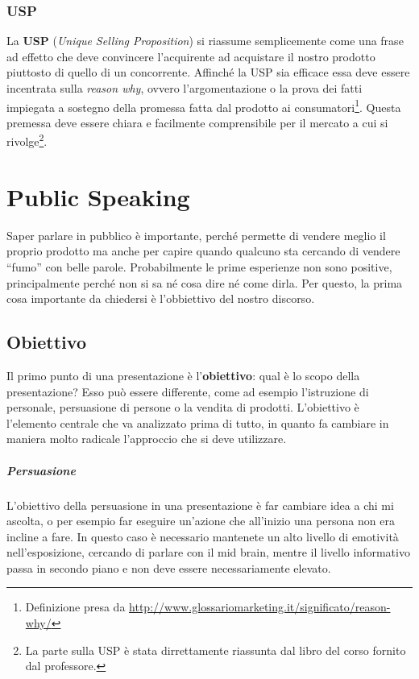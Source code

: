 \subsection{USP}

La \textbf{USP} (\textit{Unique Selling Proposition}) si riassume semplicemente 
come una frase ad effetto che deve convincere l'acquirente ad acquistare il 
nostro prodotto piuttosto di quello di un concorrente.
Affinché la USP sia efficace essa deve essere incentrata sulla \textit{reason 
why}, ovvero l’argomentazione o la prova dei fatti impiegata a sostegno della 
promessa fatta dal prodotto ai consumatori\footnote{Definizione presa da 
\url{http://www.glossariomarketing.it/significato/reason-why/}}. Questa 
premessa deve essere chiara e facilmente comprensibile per il mercato a cui si 
rivolge\footnote{La parte sulla USP è stata dirrettamente riassunta dal libro 
del corso fornito dal professore.}.

\chapter{Public Speaking}

Saper parlare in pubblico è importante, perché permette di vendere meglio il
proprio prodotto ma anche per capire quando qualcuno sta cercando di vendere
``fumo'' con belle parole. Probabilmente le prime esperienze non sono positive,
principalmente perché non si sa né cosa dire né come dirla. Per questo, la
prima cosa importante da chiedersi è l'obbiettivo del nostro discorso.

\section{Obiettivo}

Il primo punto di una presentazione è l'\textbf{obiettivo}: qual è lo scopo
della presentazione? Esso può essere differente, come ad esempio l'istruzione
di personale, persuasione di persone o la vendita di prodotti. L'obiettivo è
l'elemento centrale che va analizzato prima di tutto, in quanto fa
cambiare in maniera molto radicale l'approccio che si deve utilizzare.

\paragraph*{Persuasione} L'obiettivo della persuasione in una presentazione è
far cambiare idea a chi mi ascolta, o per esempio far eseguire un'azione che
all'inizio una persona non era incline a fare. In questo caso è necessario
mantenete un alto livello di emotività nell'esposizione, cercando di parlare
con il mid brain, mentre il livello informativo passa in secondo piano e non
deve essere necessariamente elevato.

